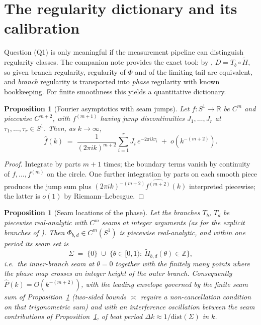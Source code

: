 \documentclass[11pt,a4paper]{article}
\newtheorem{proposition}[theorem]{Proposition}
\theoremstyle{definition}
\theoremstyle{remark}
\newcommand{\R}{\mathbb{R}}
\newcommand{\Z}{\mathbb{Z}}
\newcommand{\Sone}{S^1}
\begin{document}
\section{The regularity dictionary and its calibration}\label{sec:dictionary}

Question (Q1) is only meaningful if the measurement pipeline can distinguish regularity
classes. The companion note provides the exact tool: by \cite[Rem.~7.2]{unified},
$D=T_b\circ\widetilde H$, so given branch regularity, regularity of $\Phi$ and of the
limiting tail are equivalent, and \emph{branch} regularity is transported into \emph{phase}
regularity with known bookkeeping. For finite smoothness this yields a quantitative
dictionary.

\begin{proposition}[Fourier asymptotics with seam jumps]\label{prop:fourierjump}
Let $f:\Sone\to\R$ be $C^m$ and piecewise $C^{m+2}$, with $f^{(m+1)}$ having jump
discontinuities $J_1,\dots,J_r$ at $\tau_1,\dots,\tau_r\in\Sone$. Then, as
$k\to\infty$,
\[
\widehat f(k)\;=\;\frac{1}{(2\pi i k)^{m+2}}\sum_{i=1}^{r}J_i\,e^{-2\pi i k\tau_i}
\;+\;o\!\left(k^{-(m+2)}\right).
\]
\end{proposition}

\begin{proof}
Integrate by parts $m+1$ times; the boundary terms vanish by continuity of
$f,\dots,f^{(m)}$ on the circle. One further integration by parts on each smooth piece
produces the jump sum plus $(2\pi i k)^{-(m+2)}\widehat{f^{(m+2)}}(k)$ interpreted piecewise;
the latter is $o(1)$ by Riemann--Lebesgue.
\end{proof}

\begin{proposition}[Seam locations of the phase]\label{prop:seams}
Let the branches $T_b$, $T_d$ be piecewise real-analytic with $C^m$ seams at integer
arguments (as for the explicit branches of \cite[Rem.~7.5(ii)]{unified}). Then
$\Phi_{b,d}\in C^m(\Sone)$ is piecewise real-analytic, and within one period its seam set is
\[
\Sigma\;=\;\{0\}\;\cup\;\bigl\{\theta\in[0,1):\ \widetilde H_{b,d}(\theta)\in\Z\bigr\},
\]
i.e.\ the inner-branch seam at $\theta=0$ together with the finitely many points where the
phase map crosses an integer height of the outer branch. Consequently
$\widehat P(k)=O(k^{-(m+2)})$, with the leading envelope governed by the finite
seam sum of Proposition~\ref{prop:fourierjump} (two-sided bounds $\asymp$ require a
non-cancellation condition on that trigonometric sum) and with an interference oscillation between the
seam contributions of Proposition~\ref{prop:fourierjump}, of beat period
$\Delta k\approx 1/\mathrm{dist}(\Sigma)$ in $k$.
\end{proposition}
\end{document}
